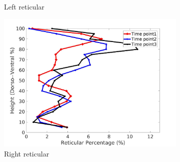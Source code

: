 \begin{figure}[H]
\begin{subfigure}{.42\linewidth}
  \caption{Left reticular}
  \label{fig:IPF3DiseaseDorsoToVentral-c} 
\end{subfigure} 
\begin{subfigure}{.42\linewidth}%
  \includegraphics[width=\linewidth,trim={{.0\wd0} {.0\wd0} {.0\wd0} {.0\wd0}},clip]{Appendix/Image_AppexA/DorsoToVentral/IPF3RightLungReticularDiseaseDorsoToVentral.jpg}
  \caption{Right reticular}
  \label{fig:IPF3DiseaseDorsoToVentral-d}
\end{subfigure}
\begin{subfigure}{.42\linewidth}%

\end{subfigure}
\end{figure}
